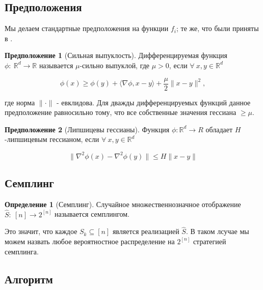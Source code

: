 \documentclass{article}
\theoremstyle{definition}
\newtheorem{definition}{Определение}
\theoremstyle{assumption}
\newtheorem{assumption}{Предположение}
\theoremstyle{lemma}
\theoremstyle{theorem}
\theoremstyle{proposition}
\begin{document}
	\subsection{Предположения}
	
	Мы делаем стандартные предположения на функции $f_i$; те же, что были приняты в  \cite{kovalev2019stochastic}.
	
	
	\begin{assumption}[Сильная выпуклость] Дифференцируемая функция $\phi:\ \mathbb R^d \rightarrow \mathbb R$ называется $\mu$-сильно выпуклой, где $\mu > 0$, если $\forall\ x, y \in \mathbb R^d$
		
		\begin{equation}\label{strong-conv}
			\phi(x) \geqslant \phi(y) + \langle \nabla \phi, x - y \rangle + \frac{\mu}{2} \| x - y \|^2,
		\end{equation}
	\end{assumption}
	где норма $\| \cdot \|$ - евклидова. Для дважды дифференцируемых функций данное предположение равносильно тому, что все собственные значения гессиана $\geqslant \mu$.
	
	\begin{assumption}[Липшицевы гессианы] Функция $\phi: \mathbb R^d \rightarrow R$ обладает $H$-липшицевым гессианом, если $\forall\ x, y \in \mathbb R^d$
		
		\begin{equation}\label{lip-hess}
			\| \nabla^2 \phi(x) - \nabla^2 \phi(y) \| \leqslant H \| x - y \|
		\end{equation}
	\end{assumption}
	
	\subsection{Семплинг}
	
	\begin{definition}[Семплинг]
		Случайное множественнозначное отображение $\hat S:\ [n] \rightarrow 2^{[n]}$ называется семплингом.
	\end{definition}
	
	Это значит, что каждое $S_k \subseteq [n]$ является реализацией $\hat S$. В таком лсучае мы можем назвать любое вероятностное распределение на $2^{[n]}$ стратегией семплинга.
	
	\subsection{Алгоритм}
	
\end{document}
